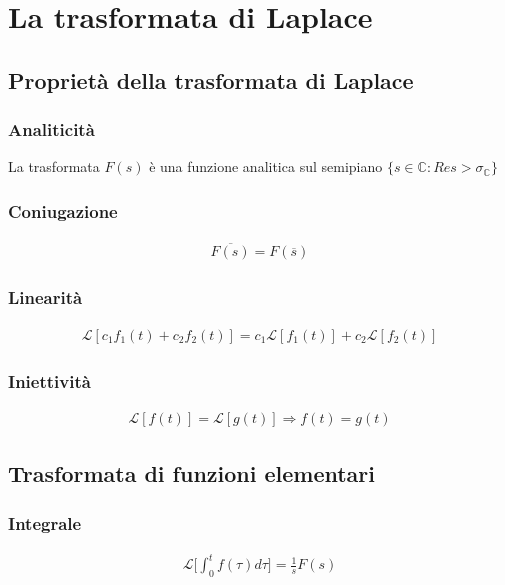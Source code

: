\chapter{La trasformata di Laplace}

\section{Proprietà della trasformata di Laplace}
\subsection{Analiticità}
La trasformata $F(s)$ \`e una funzione analitica sul semipiano $\{ s \in \mathbb{C} : Res > \sigma_{\mathbb{C}} \}$

\subsection{Coniugazione}
\begin{align}
  \overline{F(s)} = F(\overline{s})
\end{align}


\subsection{Linearità}
\begin{align}
  \mathcal{L}[c_1 f_1(t) + c_2 f_2(t)] = c_1 \mathcal{L}[f_1(t)] + c_2 \mathcal{L}[f_2(t)]
\end{align}



\subsection{Iniettività}
\begin{align}
  \mathcal{L}[f(t)] = \mathcal{L}[g(t)] \Rightarrow f(t) = g(t)
\end{align}

\section{Trasformata di funzioni elementari}
\subsection{Integrale}
\begin{align}
  \mathcal{L}\Bigg[\int_0^t f(\tau) d\tau\Bigg] = \frac{1}{s} F(s)
\end{align}

